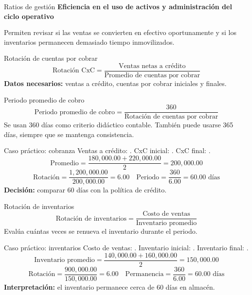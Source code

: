 \begin{frame}{Ratios de gestión}
\color{gestion}\textbf{Eficiencia en el uso de activos y administración del ciclo operativo}\color{black}

\vspace{0.7em}
Permiten revisar si las ventas se convierten en efectivo oportunamente y si los inventarios permanecen demasiado tiempo inmovilizados.
\end{frame}

\begin{frame}{Rotación de cuentas por cobrar}
\[
\text{Rotación CxC}=\frac{\text{Ventas netas a crédito}}{\text{Promedio de cuentas por cobrar}}
\]
\textbf{Datos necesarios:} ventas a crédito, cuentas por cobrar iniciales y finales.
\end{frame}

\begin{frame}{Periodo promedio de cobro}
\[
\text{Periodo promedio de cobro}=\frac{360}{\text{Rotación de cuentas por cobrar}}
\]
Se usan 360 días como criterio didáctico contable. También puede usarse 365 días, siempre que se mantenga consistencia.
\end{frame}

\begin{frame}{Caso práctico: cobranza}
\casoeducativo
\small
Ventas a crédito: . CxC inicial: . CxC final: .
\[
\text{Promedio}=\frac{180,000.00+220,000.00}{2}=200,000.00
\]
\[
\text{Rotación}=\frac{1,200,000.00}{200,000.00}=6.00
\quad
\text{Periodo}=\frac{360}{6.00}=60.00\text{ días}
\]
\textbf{Decisión:} comparar 60 días con la política de crédito.
\end{frame}

\begin{frame}{Rotación de inventarios}
\[
\text{Rotación de inventarios}=\frac{\text{Costo de ventas}}{\text{Inventario promedio}}
\]
Evalúa cuántas veces se renueva el inventario durante el periodo.
\end{frame}

\begin{frame}{Caso práctico: inventarios}
\casoeducativo
\small
Costo de ventas: . Inventario inicial: . Inventario final: .
\[
\text{Inventario promedio}=\frac{140,000.00+160,000.00}{2}=150,000.00
\]
\[
\text{Rotación}=\frac{900,000.00}{150,000.00}=6.00
\quad
\text{Permanencia}=\frac{360}{6.00}=60.00\text{ días}
\]
\textbf{Interpretación:} el inventario permanece cerca de 60 días en almacén.
\end{frame}
